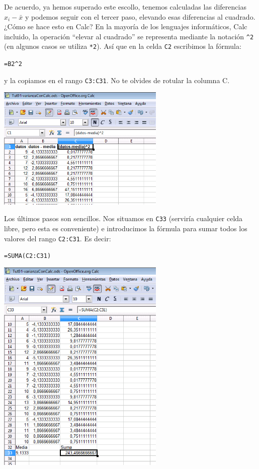 \documentclass[10pt,a4paper]{article}\usepackage[]{graphicx}\usepackage[]{color}
\begin{document}
De acuerdo, ya hemos superado este escollo, tenemos calculadas las diferencias $x_i- \bar x$ y podemos seguir con el tercer paso, elevando esas diferencias al cuadrado. ¿Cómo se hace esto en Calc? En la mayoría de los lenguajes informáticos, Calc incluido, la operación ``elevar al cuadrado'' se representa mediante la notación {\verb#^2#} (en algunos casos se utiliza {\tt **2}). Así que en la celda {\tt C2} escribimos la fórmula:
\begin{center}
{\verb#=B2^2#}
\end{center}
y la copiamos en el rango {\tt C3:C31}. No te olvides de rotular la columna C.
    \begin{center}
    \includegraphics[width=8cm]{../fig/Tut02-51.png}
    \end{center}
Los últimos pasos son sencillos. Nos situamos en {\tt C33} (serviría cualquier celda libre, pero esta es conveniente) e introducimos la fórmula para sumar todos los valores del rango {\tt C2:C31}. Es decir:
\begin{center}
{\tt =SUMA(C2:C31)}
\end{center}
    \begin{center}
    \includegraphics[width=8cm]{../fig/Tut02-52.png}
    \end{center}
\end{document}
